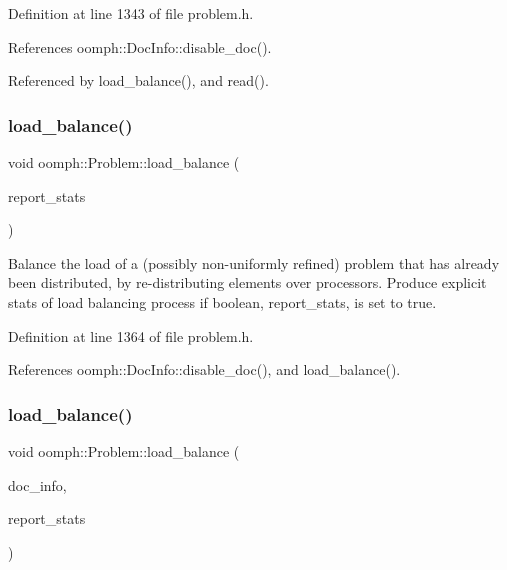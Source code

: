 Definition at line 1343 of file problem.\+h.



References oomph\+::\+Doc\+Info\+::disable\+\_\+doc().



Referenced by load\+\_\+balance(), and read().

\mbox{\label{classoomph_1_1Problem_a1d78ad991995dca1f71ae83ccaa83e25}} 
\subsubsection{\texorpdfstring{load\+\_\+balance()}{load\_balance()}\hspace{0.1cm}{\footnotesize\ttfamily [2/4]}}
{\footnotesize\ttfamily void oomph\+::\+Problem\+::load\+\_\+balance (\begin{DoxyParamCaption}\item[{const bool \&}]{report\+\_\+stats }\end{DoxyParamCaption})\hspace{0.3cm}{\ttfamily [inline]}}



Balance the load of a (possibly non-\/uniformly refined) problem that has already been distributed, by re-\/distributing elements over processors. Produce explicit stats of load balancing process if boolean, report\+\_\+stats, is set to true. 



Definition at line 1364 of file problem.\+h.



References oomph\+::\+Doc\+Info\+::disable\+\_\+doc(), and load\+\_\+balance().

\mbox{\label{classoomph_1_1Problem_abc2a02507c85322024b9859bfbd5b7bf}} 
\subsubsection{\texorpdfstring{load\+\_\+balance()}{load\_balance()}\hspace{0.1cm}{\footnotesize\ttfamily [3/4]}}
{\footnotesize\ttfamily void oomph\+::\+Problem\+::load\+\_\+balance (\begin{DoxyParamCaption}\item[{\hyperlink{classoomph_1_1DocInfo}{Doc\+Info} \&}]{doc\+\_\+info,  }\item[{const bool \&}]{report\+\_\+stats }\end{DoxyParamCaption})\hspace{0.3cm}{\ttfamily [inline]}}



